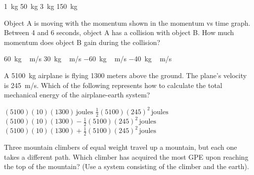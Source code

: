 \documentclass[answers,dvipsnames]{exam}
\begin{document}
\begin{questions}
\begin{randomizechoices}[norandomize]
    \choice \SI{1}{kg}
    \choice \SI{50}{kg}
    \choice \SI{3}{kg}
    \correctchoice \SI{150}{kg}
\end{randomizechoices}

\question
Object A is moving with the momentum shown in the momentum vs time graph. Between 4 and 6 seconds, object A has a collision with object B. How much momentum does object B gain during the collision?

\begin{minipage}{0.3\textwidth}
\centering
    \begin{randomizechoices}[norandomize]
        \correctchoice \SI{60}{kg\,m/s}
        \choice \SI{30}{kg\,m/s}
        \choice \SI{-60}{kg\,m/s}
        \choice \SI{-40}{kg\,m/s}
    \end{randomizechoices}
\end{minipage}%
\begin{minipage}{0.6\textwidth}
\centering
\end{minipage}

\question
A \SI{5100}{kg} airplane is flying 1300 meters above the ground. The plane's velocity is \SI{245}{m/s}. Which of the following represents how to calculate the total mechanical energy of the airplane-earth system?

\begin{randomizechoices}[norandomize]
    \smallskip
    \choice $(5100)(10)(1300)\,\text{joules}$\smallskip
    \choice $ \frac{1}{2}(5100)(245)^2\,\text{joules}$\smallskip
    \choice $(5100)(10)(1300) - \frac{1}{2}(5100)(245)^2\,\text{joules}$ \smallskip
    \correctchoice $(5100)(10)(1300) + \frac{1}{2}(5100)(245)^2\,\text{joules}$ \smallskip
\end{randomizechoices}

\question
Three mountain climbers of equal weight travel up a mountain, but each one takes a different path. Which climber has acquired the most GPE upon reaching the top of the mountain? (Use a system consisting of the climber and the earth).


\end{questions}
\end{document}
